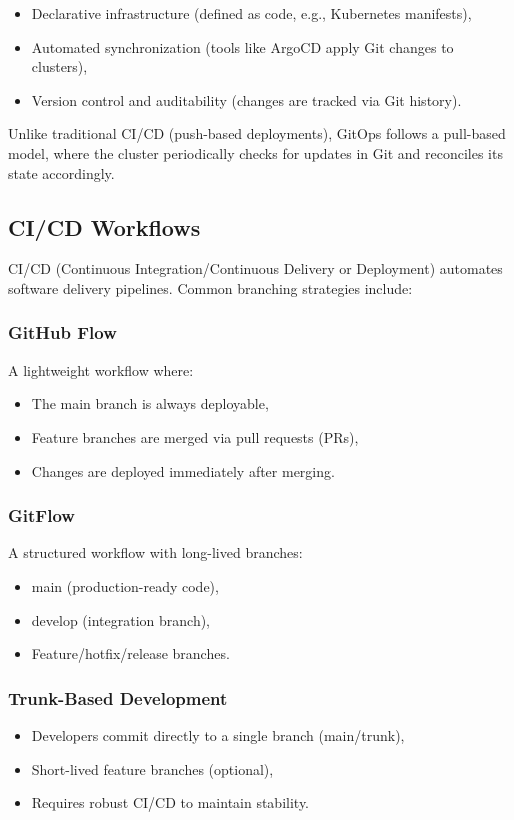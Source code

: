 \begin{itemize}
\item Declarative infrastructure (defined as code, e.g., Kubernetes manifests),
\item Automated synchronization (tools like ArgoCD apply Git changes to clusters),
\item Version control and auditability (changes are tracked via Git history).
\end{itemize}
Unlike traditional CI/CD (push-based deployments), GitOps follows a pull-based model, where the cluster periodically checks for updates in Git and reconciles its state accordingly\cite{devopsbook}.

\subsection{CI/CD Workflows}\label{subsec:ci/cd-workflows}
CI/CD
 (Continuous Integration/Continuous Delivery or Deployment) automates
software delivery pipelines.
Common branching strategies include:

\subsubsection*{GitHub Flow}
A lightweight workflow where:

\begin{itemize}
\item The main branch is always deployable,
\item Feature branches are merged via pull requests (PRs),
\item Changes are deployed immediately after merging.
\end{itemize}

\subsubsection*{GitFlow}
A structured workflow with long-lived branches:

\begin{itemize}
\item main (production-ready code),
\item develop (integration branch),
\item Feature/hotfix/release branches.
\end{itemize}
\subsubsection*{Trunk-Based Development}
\begin{itemize}
\item Developers commit directly to a single branch (main/trunk),
\item Short-lived feature branches (optional),
\item Requires robust CI/CD to maintain stability.
\end{itemize}

